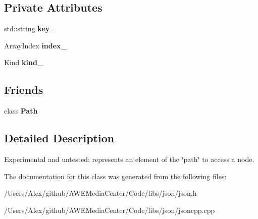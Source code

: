 \subsection*{Private Attributes}
\begin{DoxyCompactItemize}
\item 
\hypertarget{class_json_1_1_path_argument_a5d901b404323b61f066fb1adb3babfe1}{std\-::string {\bfseries key\-\_\-}}\label{class_json_1_1_path_argument_a5d901b404323b61f066fb1adb3babfe1}

\item 
\hypertarget{class_json_1_1_path_argument_afd5857d1b6bfaae6961333bdae7bd5ec}{Array\-Index {\bfseries index\-\_\-}}\label{class_json_1_1_path_argument_afd5857d1b6bfaae6961333bdae7bd5ec}

\item 
\hypertarget{class_json_1_1_path_argument_ad4bc4b544b155a3d9c7788572ecf991b}{Kind {\bfseries kind\-\_\-}}\label{class_json_1_1_path_argument_ad4bc4b544b155a3d9c7788572ecf991b}

\end{DoxyCompactItemize}
\subsection*{Friends}
\begin{DoxyCompactItemize}
\item 
\hypertarget{class_json_1_1_path_argument_a4877239a6b7f09fbf5a61ca68a49d74c}{class {\bfseries Path}}\label{class_json_1_1_path_argument_a4877239a6b7f09fbf5a61ca68a49d74c}

\end{DoxyCompactItemize}


\subsection{Detailed Description}
Experimental and untested\-: represents an element of the \char`\"{}path\char`\"{} to access a node. 

The documentation for this class was generated from the following files\-:\begin{DoxyCompactItemize}
\item 
/\-Users/\-Alex/github/\-A\-W\-E\-Media\-Center/\-Code/libs/json/json.\-h\item 
/\-Users/\-Alex/github/\-A\-W\-E\-Media\-Center/\-Code/libs/json/jsoncpp.\-cpp\end{DoxyCompactItemize}
